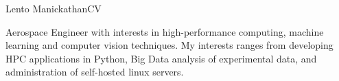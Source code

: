 \documentclass[11pt, a4paper]{preamble/awesome-cv-novo}
\begin{document}
\makecvheader[L]

\makecvfooter
  {Lento Manickathan\enskip\textbar\enskip CV}
  {}
  {\thepage}




\begin{cvparagraph}

Aerospace Engineer with interests in high-performance computing, machine learning and computer vision techniques.
My interests ranges from developing HPC applications in Python, Big Data analysis of experimental data, and
administration of self-hosted linux servers.

\end{cvparagraph}


\end{document}
